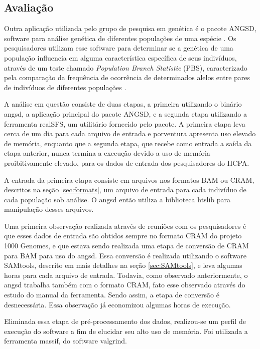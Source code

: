\documentclass[cic,tc]{iiufrgs}
\begin{document}
\subsection{Avaliação}

Outra aplicação utilizada pelo grupo de pesquisa em genética é o pacote ANGSD,
software para análise genética de diferentes populações de uma
espécie \cite{korneliussen2014angsd}. Os pesquisadores utilizam esse software
para determinar se a genética de uma população influencia em alguma
característica específica de seus indivíduos, através de um teste chamado
\textit{Population Branch Statistic} (PBS), caracterizado pela comparação da
frequência de ocorrência de determinados alelos entre pares de
indivíduos de diferentes populações \cite{yi2010sequencing}.

A análise em questão consiste de duas etapas, a primeira utilizando o binário
angsd, a aplicação principal do pacote ANGSD, e a segunda etapa utilizando a
ferramenta realSFS, um utilitário fornecido pelo pacote. A primeira etapa leva
cerca de um dia para cada arquivo de entrada e porventura apresenta uso elevado
de memória, enquanto que a segunda etapa, que recebe como entrada a saída da
etapa anterior, nunca termina a execução devido a uso de memória
proibitivamente elevado, para os dados de entrada dos pesquisadores do HCPA.

A entrada da primeira etapa consiste em arquivos nos formatos BAM ou CRAM,
descritos na seção \ref{sec:formats}, um arquivo de entrada para cada indivíduo
de cada população sob análise. O angsd então utiliza a biblioteca
htslib para manipulação desses arquivos.

Uma primeira observação realizada através de reuniões com os pesquisadores é
que esses dados de entrada são obtidos sempre no formato CRAM do projeto 1000
Genomes, e que estava sendo realizada uma etapa de conversão de CRAM para BAM
para uso do angsd. Essa conversão é realizada utilizando o software SAMtools,
descrito em mais detalhes na seção \ref{sec:SAMtools}, e leva algumas horas
para cada arquivo de entrada. Todavia, como observado anteriormente, o angsd
trabalha também com o formato CRAM, fato esse observado através do estudo do
manual da ferramenta. Sendo assim, a etapa de conversão é desnecessária. Essa
observação já economizou algumas horas de execução.

Eliminada essa etapa de pré-processamento dos dados, realizou-se um perfil de
execução do software a fim de elucidar seu alto uso de memória. Foi utilizada a
ferramenta massif, do software valgrind.
\end{document}
